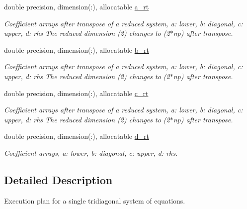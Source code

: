 \textbf{ }\par
\begin{DoxyCompactItemize}
\item 
double precision, dimension(\+:), allocatable \mbox{\hyperlink{structpascal__tdma_1_1ptdma__plan__single_ad8bed95f594c23d7df9467e204025a74}{a\+\_\+rt}}
\begin{DoxyCompactList}\small\item\em Coefficient arrays after transpose of a reduced system, a\+: lower, b\+: diagonal, c\+: upper, d\+: rhs The reduced dimension (2) changes to (2$\ast$np) after transpose. \end{DoxyCompactList}\item 
double precision, dimension(\+:), allocatable \mbox{\hyperlink{structpascal__tdma_1_1ptdma__plan__single_a8e9487525ccef0d45c8a5440103613b0}{b\+\_\+rt}}
\begin{DoxyCompactList}\small\item\em Coefficient arrays after transpose of a reduced system, a\+: lower, b\+: diagonal, c\+: upper, d\+: rhs The reduced dimension (2) changes to (2$\ast$np) after transpose. \end{DoxyCompactList}\item 
double precision, dimension(\+:), allocatable \mbox{\hyperlink{structpascal__tdma_1_1ptdma__plan__single_a7169b89281236696ea6eb5631ce44d95}{c\+\_\+rt}}
\begin{DoxyCompactList}\small\item\em Coefficient arrays after transpose of a reduced system, a\+: lower, b\+: diagonal, c\+: upper, d\+: rhs The reduced dimension (2) changes to (2$\ast$np) after transpose. \end{DoxyCompactList}\item 
double precision, dimension(\+:), allocatable \mbox{\hyperlink{structpascal__tdma_1_1ptdma__plan__single_a627be8624cd48aa5b3aad7f6cf8d0b08}{d\+\_\+rt}}
\begin{DoxyCompactList}\small\item\em Coefficient arrays, a\+: lower, b\+: diagonal, c\+: upper, d\+: rhs. \end{DoxyCompactList}\end{DoxyCompactItemize}



\subsection{Detailed Description}
Execution plan for a single tridiagonal system of equations. 

